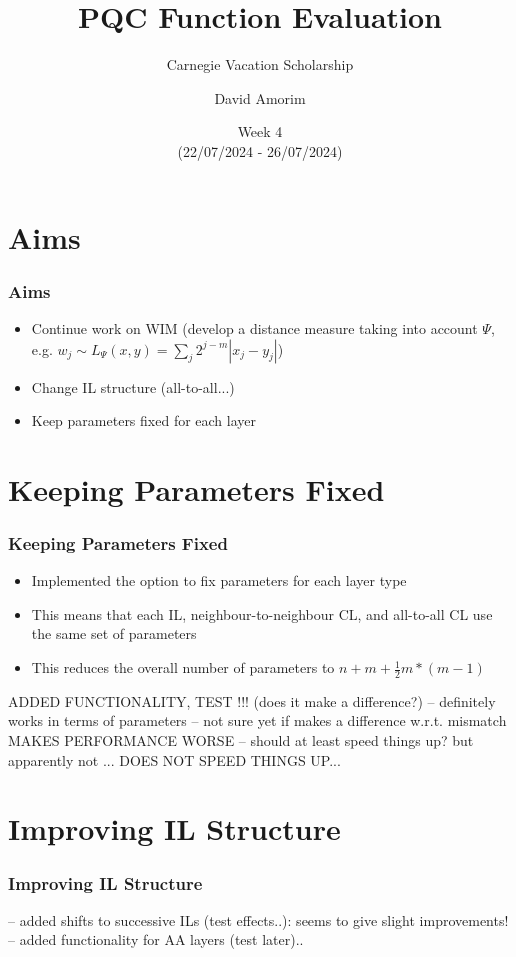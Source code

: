 \documentclass{beamer}
\title[PQC Function Evaluation]{PQC Function Evaluation}
\subtitle{Carnegie Vacation Scholarship}
\author[David Amorim]{David Amorim}
\institute[]{}
\date[29/07/2024]{Week 4 \\(22/07/2024 - 26/07/2024)}
\begin{document}
\frame{\titlepage}

\section{Aims}

\begin{frame}
\frametitle{Aims}
\begin{itemize}
\item Continue work on WIM (develop a distance measure taking into account $\Psi$, e.g. $w_j \sim L_\Psi (x,y)=\sum_j 2^{j-m} |x_j -y_j|$) 
\item Change IL structure (all-to-all...)
\item Keep parameters fixed for each layer
\end{itemize}
\end{frame}

\section{Keeping Parameters Fixed}

\begin{frame}
\frametitle{Keeping Parameters Fixed}
\begin{itemize}
\item Implemented the option to \alert{fix parameters for each layer type}
\item This means that each IL, neighbour-to-neighbour CL, and all-to-all CL use the same set of parameters 
\item This reduces the overall number of parameters to $n + m + \frac{1}{2} m * (m-1)$
\end{itemize}

ADDED FUNCTIONALITY, TEST !!! (does it make a difference?)
-- definitely works in terms of parameters 
-- not sure yet if makes a difference w.r.t. mismatch MAKES PERFORMANCE WORSE 
-- should at least speed things up? but apparently not ... DOES NOT SPEED THINGS UP...
\end{frame}

\section{Improving IL Structure}

\begin{frame}
\frametitle{Improving IL Structure}
-- added shifts to successive ILs (test effects..): seems to give slight improvements! 
-- added functionality for AA layers (test later)..
\end{frame}
\end{document}
